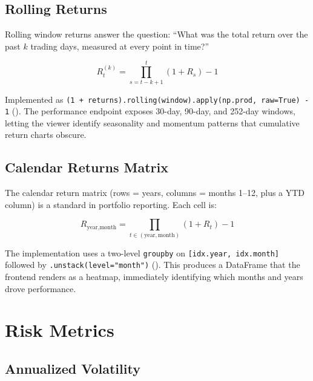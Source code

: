 \subsection{Rolling Returns}

Rolling window returns answer the question: ``What was the total return over the past $k$ trading days, measured at every point in time?''

\begin{equation}
  R_t^{(k)} = \prod_{s=t-k+1}^{t}(1 + R_s) - 1
  \label{eq:rolling-return}
\end{equation}

Implemented as \texttt{(1 + returns).rolling(window).apply(np.prod, raw=True) - 1} (). The performance endpoint exposes 30-day, 90-day, and 252-day windows, letting the viewer identify seasonality and momentum patterns that cumulative return charts obscure.

\subsection{Calendar Returns Matrix}

The calendar return matrix (rows = years, columns = months 1--12, plus a YTD column) is a standard in portfolio reporting. Each cell is:

\begin{equation}
  R_{\text{year},\text{month}} = \prod_{t \in (\text{year},\text{month})} (1 + R_t) - 1
  \label{eq:calendar-return}
\end{equation}

The implementation uses a two-level \texttt{groupby} on \texttt{[idx.year, idx.month]} followed by \texttt{.unstack(level="month")} (). This produces a DataFrame that the frontend renders as a heatmap, immediately identifying which months and years drove performance.

\section{Risk Metrics}
\label{sec:portfolio-risk}


\subsection{Annualized Volatility}

